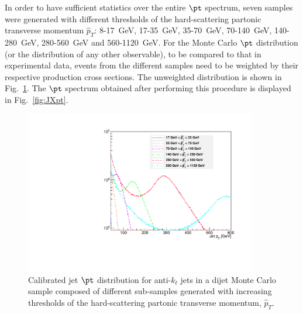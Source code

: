 In order to have sufficient statistics over the entire $\pt$ spectrum, seven samples were generated with different thresholds of the hard-scattering partonic transverse momentum $\hat{p}_T$: 8-17~GeV, 17-35~GeV, 35-70~GeV, 70-140~GeV, 140-280~GeV, 280-560~GeV and 560-1120~GeV.
 For the Monte Carlo $\pt$ distribution (or the distribution of any other observable),  to be compared to that in experimental data, events from the different samples need to be weighted by their respective production cross sections. The unweighted distribution is shown in Fig.~\ref{fig:JXptNW}. The $\pt$ spectrum obtained after performing this procedure is displayed in Fig.~\ref{fig:JXpt}.

\begin{figure}[tp]
\centering
\includegraphics[width=0.9\textwidth]{JXspectrum_NoWeights.pdf}
\caption{Calibrated jet $\pt$ distribution for anti-$k_t$ jets in a dijet Monte Carlo sample composed of different sub-samples generated with increasing thresholds of the hard-scattering partonic transverse momentum, $\hat{p}_T$. }
\label{fig:JXptNW}
\end{figure}

